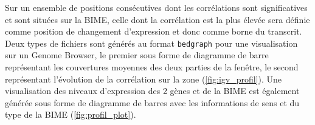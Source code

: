 \documentclass[12pt,a4paper]{report}
\begin{document}
\begin{onehalfspace}
\begin{figure}
\end{figure}

Sur un ensemble de positions consécutives dont les corrélations sont significatives et sont situées sur la BIME, celle dont la corrélation est la plus élevée sera définie comme position de changement d'expression et donc comme borne du transcrit. Deux types de fichiers sont générés au format \texttt{bedgraph} pour une visualisation sur un Genome Browser, le premier sous forme de diagramme de barre représentant les couvertures moyennes des deux parties de la fenêtre, le second représentant l'évolution de la corrélation sur la zone (\autoref{fig:igv_profil}). Une visualisation des niveaux d'expression des 2 gènes et de la BIME est également générée sous forme de diagramme de barres avec les informations de sens et du type de la BIME (\autoref{fig:profil_plot}).


\end{onehalfspace}
\end{document}
